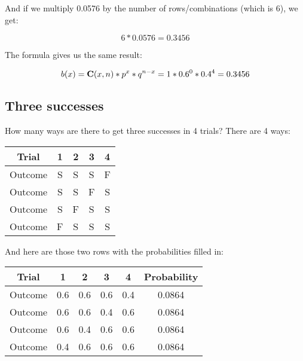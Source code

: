 \documentclass[../../../main.tex]{subfiles}
\begin{document}
\noindent
And if we multiply 0.0576 by the number of rows/combinations (which is 6), we get:

\begin{equation*}
    6 * 0.0576 = 0.3456
\end{equation*}

\noindent
The formula gives us the same result:

\begin{equation*}
  \Binom{\RandVarVal/} = \combs{\RandVarVal/}{n} * p^{\RandVarVal/} * q^{n - \RandVarVal/} = 1 * 0.6^{0} * 0.4^{4} = 0.3456
\end{equation*}


\subsection{Three successes}

How many ways are there to get three successes in 4 trials? There are 4 ways:

\begin{center}
  \begin{tabular}{| c | c | c | c | c |}
    \hline
    \textbf{Trial} & \textbf{1} & \textbf{2} & \textbf{3} & \textbf{4} \\ \hline
  Outcome & S & S & S & F \\ \hline
  Outcome & S & S & F & S \\ \hline
  Outcome & S & F & S & S \\ \hline
  Outcome & F & S & S & S \\ \hline
  \end{tabular}
\end{center}

\noindent
And here are those two rows with the probabilities filled in:

\begin{center}
  \begin{tabular}{| c | c | c | c | c | c |}
    \hline
    \textbf{Trial} & \textbf{1} & \textbf{2} & \textbf{3} & \textbf{4} & \textbf{Probability} \\ \hline
  Outcome & 0.6 & 0.6 & 0.6 & 0.4 & 0.0864 \\ \hline
  Outcome & 0.6 & 0.6 & 0.4 & 0.6 & 0.0864 \\ \hline
  Outcome & 0.6 & 0.4 & 0.6 & 0.6 & 0.0864 \\ \hline
  Outcome & 0.4 & 0.6 & 0.6 & 0.6 & 0.0864 \\ \hline
  \end{tabular}
\end{center}
\end{document}
